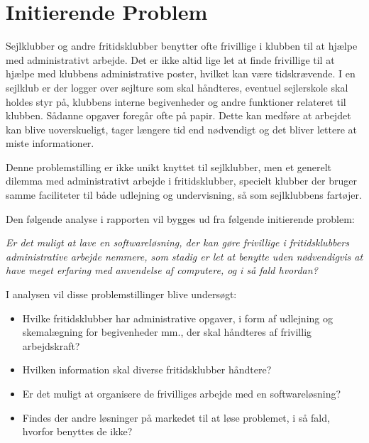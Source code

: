 \section{Initierende Problem}
Sejlklubber og andre fritidsklubber benytter ofte frivillige i klubben til at hjælpe med administrativt arbejde. Det er
ikke altid lige let at finde frivillige til at hjælpe med klubbens administrative poster, hvilket kan være tidskrævende.
I en sejlklub er der logger over sejlture som skal håndteres, eventuel sejlerskole skal holdes styr på, klubbens interne
begivenheder og andre funktioner relateret til klubben. Sådanne opgaver foregår ofte på papir. Dette kan medføre at
arbejdet kan blive uoverskueligt, tager længere tid end nødvendigt og det bliver lettere at miste informationer.

Denne problemstilling er ikke unikt knyttet til sejlklubber, men et generelt dilemma med administrativt arbejde i
fritidsklubber, specielt klubber der bruger samme faciliteter til både udlejning og undervisning, så som sejlklubbens
fartøjer.

Den følgende analyse i rapporten vil bygges ud fra følgende initierende problem:

\textit{Er det muligt at lave en softwareløsning, der kan gøre frivillige i fritidsklubbers administrative arbejde
nemmere, som stadig er let at benytte uden nødvendigvis at have meget erfaring med anvendelse af computere, og i så fald
hvordan?}

I analysen vil disse problemstillinger blive undersøgt:
\begin{itemize}
\item Hvilke fritidsklubber har administrative opgaver, i form af udlejning og skemalægning for begivenheder mm., der
skal håndteres af frivillig arbejdskraft?
\item Hvilken information skal diverse fritidsklubber håndtere?
\item Er det muligt at organisere de frivilliges arbejde med en softwareløsning?
\item Findes der andre løsninger på markedet til at løse problemet, i så fald, hvorfor benyttes de ikke?
\end{itemize}